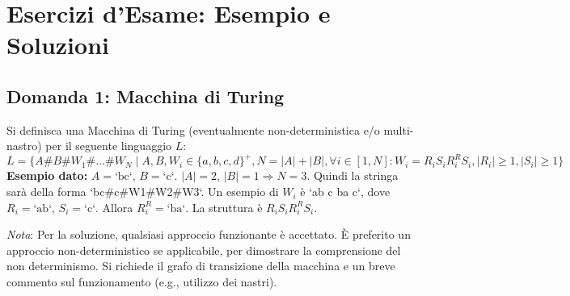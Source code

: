 \documentclass[a4paper]{article}
\begin{document}
\section{Esercizi d'Esame: Esempio e Soluzioni}

\subsection{Domanda 1: Macchina di Turing}
Si definisca una Macchina di Turing (eventualmente non-deterministica e/o multi-nastro) per il seguente linguaggio $L$:
\[ L = \{ A \# B \# W_1 \# \dots \# W_N \mid A, B, W_i \in \{a,b,c,d\}^+, N = |A| + |B|, \forall i \in [1, N]: W_i = R_i S_i R_i^R S_i, |R_i| \ge 1, |S_i| \ge 1 \} \]
\textbf{Esempio dato:} $A = \text{`bc`}$, $B = \text{`c`}$. $|A|=2$, $|B|=1 \Rightarrow N = 3$.
Quindi la stringa sarà della forma `bc#c#W1#W2#W3`.
Un esempio di $W_i$ è `ab c ba c`, dove $R_i=\text{`ab`}$, $S_i=\text{`c`}$. Allora $R_i^R = \text{`ba`}$. La struttura è $R_i S_i R_i^R S_i$.

\textit{Nota}: Per la soluzione, qualsiasi approccio funzionante è accettato. È preferito un approccio non-deterministico se applicabile, per dimostrare la comprensione del non determinismo. Si richiede il grafo di transizione della macchina e un breve commento sul funzionamento (e.g., utilizzo dei nastri).
\end{document}
